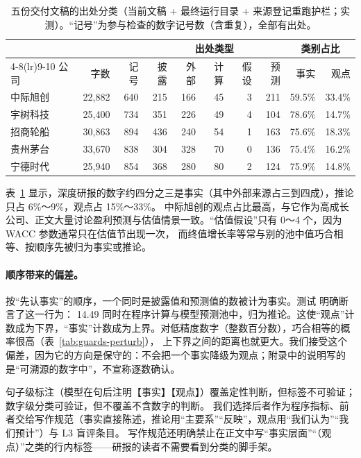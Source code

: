 \begin{table}[t]
\centering
\caption{五份交付文稿的出处分类（当前文稿 + 最终运行目录 + 来源登记重跑护栏；实测）。“记号”为参与检查的数字记号数（含重复），全部有出处。}
\label{tab:guards-prov}
\small
\begin{tabular}{@{}lrrrrrrrrr@{}}
\toprule
 & & & \multicolumn{5}{c}{出处类型} & \multicolumn{2}{c}{类别占比} \\
\cmidrule(lr){4-8}\cmidrule(lr){9-10}
公司 & 字数 & 记号 & 披露 & 外部 & 计算 & 假设 & 预测 & 事实 & 观点 \\
\midrule
中际旭创 & 22,882 & 640 & 215 & 166 & 45 & 3 & 211 & 59.5\% & 33.4\% \\
宇树科技 & 25,400 & 734 & 351 & 226 & 49 & 4 & 104 & 78.6\% & 14.7\% \\
招商轮船 & 30,863 & 894 & 436 & 240 & 54 & 1 & 163 & 75.6\% & 18.3\% \\
贵州茅台 & 33,670 & 838 & 304 & 328 & 70 & 0 & 136 & 75.4\% & 16.2\% \\
宁德时代 & 25,940 & 854 & 368 & 280 & 80 & 2 & 124 & 75.9\% & 14.8\% \\
\bottomrule
\end{tabular}
\end{table}

表~\ref{tab:guards-prov} 显示，深度研报的数字约四分之三是事实（其中外部来源占三到四成），推论只占 6\%～9\%，观点占 15\%～33\%。
中际旭创的观点占比最高，与它作为高成长公司、正文大量讨论盈利预测与估值情景一致。“估值假设”只有 0～4 个，因为 WACC 参数通常只在估值节出现一次，
而终值增长率等常与别的池中值巧合相等、按顺序先被归为事实或推论。

\paragraph{顺序带来的偏差。}按“先认事实”的顺序，一个同时是披露值和预测值的数被计为事实。测试  明确断言了这一行为：
14.49 同时在程序计算与模型预测池中，归为推论。这使“观点”计数成为下界，“事实”计数成为上界。对低精度数字（整数百分数），巧合相等的概率很高（表~\ref{tab:guards-perturb}），
上下界之间的距离也就更大。我们接受这个偏差，因为它的方向是保守的：不会把一个事实降级为观点；附录中的说明写的是“可溯源的数字中”，不宣称逐数确认。

\begin{tradeoff}
句子级标注（模型在句后注明【事实】【观点】）覆盖定性判断，但标签不可验证；数字级分类可验证，但不覆盖不含数字的判断。
我们选择后者作为程序指标、前者交给写作规范（事实直接陈述，推论用“主要系”“反映”，观点用“我们认为”“我们预计”）与 L3 盲评条目。
写作规范还明确禁止在正文中写“事实层面”“（观点）”之类的行内标签——研报的读者不需要看到分类的脚手架。
\end{tradeoff}

